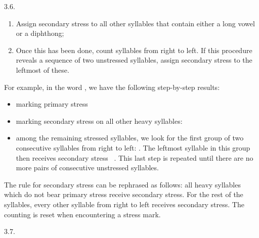 \begin{refsection}
\begin{practiceproblemsolution}{3.6. \langnameFijian}
\begin{solutions}[label=Solution 3.6\alph*]
\begin{enumerate}
    \item Assign secondary stress to all other syllables that contain either a long vowel or a diphthong;
    \item Once this has been done, count syllables from right to left. If this procedure reveals a sequence of two unstressed syllables, assign secondary stress to the leftmost of these.
\end{enumerate}
\end{solutions}

For example, in the word , we have the following step-by-step results:
\begin{itemize}
    \item marking primary stress \textrightarrow\ 
    \item marking secondary stress on all other heavy syllables: 
    \item among the remaining stressed syllables, we look for the first group of two consecutive syllables from right to left: . The leftmost syllable in this group then receives secondary stress \textrightarrow\ . This last step is repeated until there are no more pairs of consecutive unstressed syllables.
\end{itemize}

The rule for secondary stress can be rephrased as follows: all heavy syllables which do not bear primary stress receive secondary stress. For the rest of the syllables, every other syllable from right to left receives secondary stress. The counting is reset when encountering a stress mark.
\end{practiceproblemsolution}


\begin{practiceproblemsolution}{3.7. \langnameOldNorse}
\begin{solutions}[label=Solution 3.7\alph*]
    \item
    \begin{enumerate}[label = (\arabic*)]


\end{enumerate}
\end{solutions}
\end{practiceproblemsolution}
\end{refsection}
